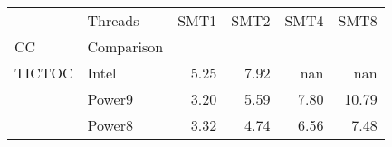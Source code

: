 \begin{tabular}{llrrrr}
\toprule
       & Threads &  SMT1 &  SMT2 &  SMT4 &  SMT8 \\
CC & Comparison &       &       &       &       \\
\midrule
TICTOC & Intel &  5.25 &  7.92 &   nan &   nan \\
       & Power9 &  3.20 &  5.59 &  7.80 & 10.79 \\
       & Power8 &  3.32 &  4.74 &  6.56 &  7.48 \\
\bottomrule
\end{tabular}
